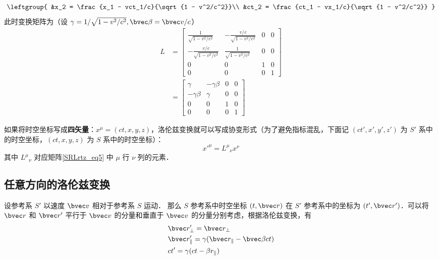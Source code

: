 \begin{equation}
\leftgroup{
&x_2 = \frac{x_1 - vct_1/c}{\sqrt{1 - v^2/c^2}}\\
&ct_2 = \frac{ct_1 - vx_1/c}{\sqrt{1 - v^2/c^2}}
}
\end{equation}
此时变换矩阵为（设 $\gamma=1/\sqrt{1-v^2/c^2},\bvec \beta=\bvec v/c$）
\begin{equation}\label{SRLrtz_eq5}
\begin{aligned}
L&=
\left[\begin{matrix}
\frac{1}{\sqrt{1-v^2/c^2}}& -\frac{v/c}{\sqrt{1-v^2/c^2}}& 0& 0\\
-\frac{v/c}{\sqrt{1-v^2/c^2}}& \frac{1}{\sqrt{1-v^2/c^2}}& 0& 0\\
0&0&1&0\\
0&0&0&1
\end{matrix}\right]\\
&=
\left[\begin{matrix}
\gamma& -\gamma\beta& 0& 0\\
-\gamma\beta& \gamma& 0& 0\\
0&0&1&0\\
0&0&0&1
\end{matrix}\right]
\end{aligned}
\end{equation}

如果将时空坐标写成\textbf{四矢量}：$x^{\mu}=(ct,x,y,z)$，洛伦兹变换就可以写成协变形式（为了避免指标混乱，下面记 $(ct',x',y',z')$ 为 $S'$ 系中的时空坐标，$(ct,x,y,z)$ 为 $S$ 系中的时空坐标）：
\begin{equation}
x'^{\mu}={L^\mu}_\nu x^\nu
\end{equation}
其中 ${L^\mu}_\nu$ 对应矩阵\autoref{SRLrtz_eq5} 中 $\mu$ 行 $\nu$ 列的元素．
\subsection{任意方向的洛伦兹变换}
设参考系 $S'$ 以速度 $\bvec v$ 相对于参考系 $S$ 运动．
那么 $S$ 参考系中时空坐标 $(t,\bvec r)$ 在 $S'$ 参考系中的坐标为 $(t',\bvec r')$．可以将 $\bvec r$ 和 $\bvec r'$ 平行于 $\bvec v$ 的分量和垂直于 $\bvec v$ 的分量分别考虑，根据洛伦兹变换，有
\begin{equation}
\begin{aligned}
&\bvec r'_{\perp}=\bvec r_{\perp}\\
&\bvec r'_{\parallel}=\gamma(\bvec r_{\parallel}-\bvec \beta ct)\\
&ct'=\gamma(ct-\beta r_{\parallel})
\end{aligned}
\end{equation}

